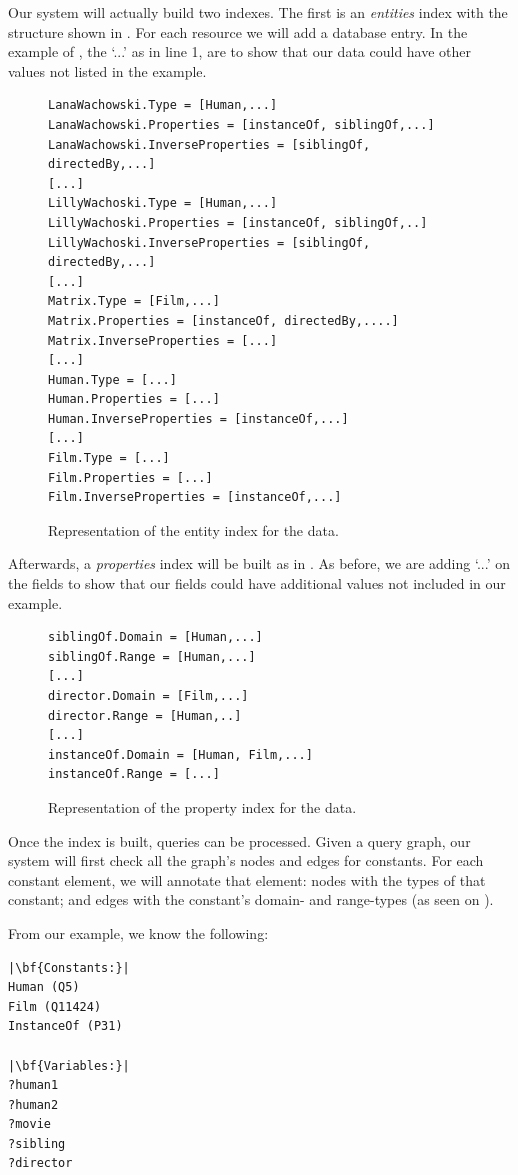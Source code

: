 Our system will actually build two indexes. The first is an \textit{entities} index with the structure shown in . For each resource we will add a database entry. In the example of , the `...' as in line 1, are to show that our data could have other values not listed in the example. 
\begin{figure}[H]
\begin{verbatim}
LanaWachowski.Type = [Human,...]
LanaWachowski.Properties = [instanceOf, siblingOf,...]
LanaWachowski.InverseProperties = [siblingOf, directedBy,...]
[...]
LillyWachoski.Type = [Human,...]
LillyWachoski.Properties = [instanceOf, siblingOf,..]
LillyWachoski.InverseProperties = [siblingOf, directedBy,...]
[...]
Matrix.Type = [Film,...]
Matrix.Properties = [instanceOf, directedBy,....]
Matrix.InverseProperties = [...]
[...]
Human.Type = [...]
Human.Properties = [...]
Human.InverseProperties = [instanceOf,...]
[...]
Film.Type = [...]
Film.Properties = [...]
Film.InverseProperties = [instanceOf,...]
\end{verbatim}
\caption{Representation of the entity index for the  data.}
\label{fig:siblingsEntityIndex}
\end{figure}

Afterwards, a \textit{properties} index will be built as in . As before, we are adding `...' on the fields to show that our fields could have additional values not included in our example.
\begin{figure}[H]
\begin{verbatim}
siblingOf.Domain = [Human,...]
siblingOf.Range = [Human,...]
[...]
director.Domain = [Film,...]
director.Range = [Human,..]
[...]
instanceOf.Domain = [Human, Film,...]
instanceOf.Range = [...]
\end{verbatim}
\caption{Representation of the property index for the  data.}
\label{fig:siblingsPropertyIndex}
\end{figure}

Once the index is built, queries can be processed. Given a query graph, our system will first check all the graph's nodes and edges for constants. For each constant element, we will annotate that element: nodes with the types of that constant; and edges with the constant's domain- and range-types (as seen on ). 

From our example, we know the following:

\begin{verbatim}
|\bf{Constants:}|
Human (Q5)
Film (Q11424)
InstanceOf (P31)

|\bf{Variables:}|
?human1
?human2
?movie
?sibling
?director
\end{verbatim}

